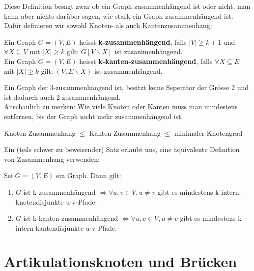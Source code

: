 \documentclass[a4paper]{report}
\begin{document}
Diese Definition besagt zwar ob ein Graph zusammenhängend ist oder nicht, man kann aber nichts darüber sagen,
wie stark ein Graph zusammenhängend ist. Dafür definieren wir sowohl Knoten- als auch Kantenzusammenhang:

\begin{tcolorbox}[colframe=dcBlue,title=Definition]
    Ein Graph $G = (V,E)$ heisst \textbf{k-zusammenhängend}, falls $|V| \geq k + 1$ und $\forall X \subseteq V$
    mit $|X| \geq k$ gilt: $G[V \backslash X]$ ist zusammenhängend. \\

    Ein Graph $G = (V,E)$ heisst \textbf{k-kanten-zusammenhängend}, falls $\forall X \subseteq E$
    mit $|X| \geq k$ gilt: $(V, E \backslash X)$ ist zusammenhängend.
\end{tcolorbox}
\bigskip

Ein Graph der 3-zusammenhängend ist, besitzt keine Seperator der Grösse 2 und ist dadurch auch 2-zusammenhängend. \\

Anschaulich zu merken: Wie viele Knoten oder Kanten muss man mindestens entfernen, bis der Graph nicht mehr
zusammenhängend ist.

\begin{tcolorbox}[colframe=dcGreen,title=Es Gilt]
    Knoten-Zusammenhang $\leq$ Kanten-Zusammenhang $\leq$ minimaler Knotengrad
\end{tcolorbox}
\bigskip

Ein (teils schwer zu beweisender) Satz erlaubt uns, eine äquivalente Definition von Zusammenhang
verwenden:

\begin{tcolorbox}[colframe=dcRed,title=Satz von Menger]
    Sei $G = (V, E)$ ein Graph. Dann gilt:
    \begin{enumerate}
        \item $G$ ist k-zusammenhängend $\Leftrightarrow \forall u,v \in V, u \neq v$ gibt es mindestens k intern-knotendisjunkte u-v-Pfade.
        \item $G$ ist k-kanten-zusammenhängend $\Leftrightarrow \forall u,v \in V, u \neq v$ gibt es mindestens k intern-kantendisjunkte u-v-Pfade.
    \end{enumerate}
\end{tcolorbox}
\bigskip

\section{Artikulationsknoten und Brücken}
\end{document}
